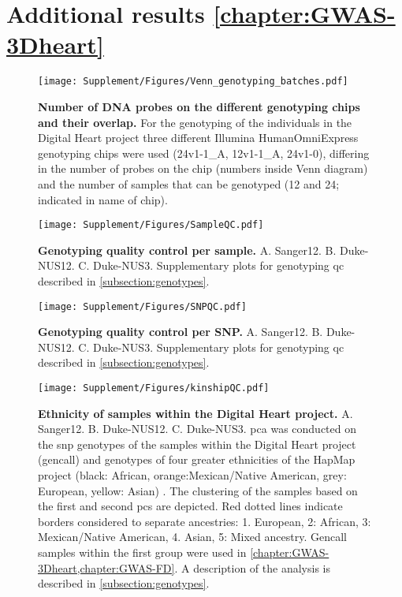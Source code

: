 \section{Additional results \cref{chapter:GWAS-3Dheart}}
\begin{figure}[hbtp]
	\centering
	\texttt{[image: Supplement/Figures/Venn\_genotyping\_batches.pdf]}
	\caption[\textbf{Number of DNA probes on the different genotyping chips and their overlap.}]{\textbf{Number of DNA probes on the different genotyping chips and their overlap.} For the genotyping of the individuals in the Digital Heart project three different Illumina HumanOmniExpress genotyping chips were used (24v1-1\_A, 12v1-1\_A, 24v1-0), differing in the number of probes on the chip (numbers inside Venn diagram) and the number of samples that can be genotyped (12 and 24; indicated in name of chip).}
 	\label{fig:probeoverlap}
\end{figure}

\begin{figure}[hbtp]
	\centering
	\texttt{[image: Supplement/Figures/SampleQC.pdf]}
	\caption[\textbf{Genotyping quality control per sample.}]{\textbf{Genotyping quality control per sample.} A. Sanger12. B. Duke-NUS12. C. Duke-NUS3. Supplementary plots for genotyping \gls{qc} described in \cref{subsection:genotypes}.}
 	\label{fig:sampleQC}
\end{figure}

\begin{figure}[hbtp]
	\centering
	\texttt{[image: Supplement/Figures/SNPQC.pdf]}
	\caption[\textbf{Genotyping quality control per SNP.}]{\textbf{Genotyping quality control per SNP.} A. Sanger12. B. Duke-NUS12. C. Duke-NUS3. Supplementary plots for genotyping \gls{qc} described in \cref{subsection:genotypes}.}
 	\label{fig:SNPQC}
 	\end{figure}

\begin{figure}[hbtp]
	\centering
	\texttt{[image: Supplement/Figures/kinshipQC.pdf]}
	\caption[\textbf{Ethnicity of samples within the Digitial Heart project. }]{\textbf{Ethnicity of samples within the Digital Heart project.} A. Sanger12. B. Duke-NUS12. C. Duke-NUS3. \gls{pca} was conducted on the \gls{snp} genotypes of the samples within the Digital Heart project (gencall) and genotypes of four greater ethnicities of the HapMap project (black: African, orange:Mexican/Native American, grey: European, yellow: Asian) \citep{HapMap2005,HapMap2007}. The clustering of the samples based on the first and second \glspl{pc} are depicted. Red dotted lines indicate borders considered to separate ancestries: 1. European, 2: African, 3: Mexican/Native American, 4. Asian, 5: Mixed ancestry. Gencall samples within the first group were used in \cref{chapter:GWAS-3Dheart,chapter:GWAS-FD}.  A description of the analysis is described in \cref{subsection:genotypes}.}
 	\label{fig:kinshipQC}
\end{figure}

